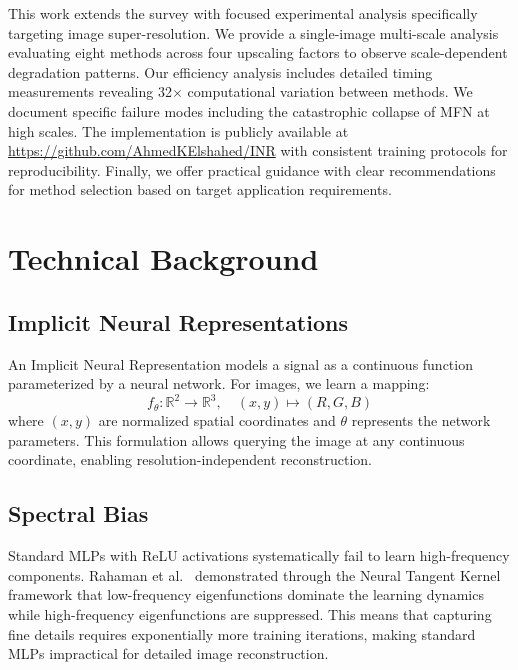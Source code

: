 \documentclass[a4paper,oneside,10pt,ngerman,english]{scrartcl}
\begin{document}
This work extends the survey with focused experimental analysis specifically targeting image super-resolution. We provide a single-image multi-scale analysis evaluating eight methods across four upscaling factors to observe scale-dependent degradation patterns. Our efficiency analysis includes detailed timing measurements revealing 32$\times$ computational variation between methods. We document specific failure modes including the catastrophic collapse of MFN at high scales. The implementation is publicly available at \url{https://github.com/AhmedKElshahed/INR} with consistent training protocols for reproducibility. Finally, we offer practical guidance with clear recommendations for method selection based on target application requirements.

\cleardoubleoddpage
\section{Technical Background}

\subsection{Implicit Neural Representations}

An Implicit Neural Representation models a signal as a continuous function parameterized by a neural network. For images, we learn a mapping:
\begin{equation}
f_\theta: \mathbb{R}^2 \to \mathbb{R}^3, \quad (x, y) \mapsto (R, G, B)
\end{equation}
where $(x, y)$ are normalized spatial coordinates and $\theta$ represents the network parameters. This formulation allows querying the image at any continuous coordinate, enabling resolution-independent reconstruction.

\subsection{Spectral Bias}

Standard MLPs with ReLU activations systematically fail to learn high-frequency components. Rahaman et al.~\cite{rahaman2019spectral} demonstrated through the Neural Tangent Kernel framework that low-frequency eigenfunctions dominate the learning dynamics while high-frequency eigenfunctions are suppressed. This means that capturing fine details requires exponentially more training iterations, making standard MLPs impractical for detailed image reconstruction.
\end{document}
